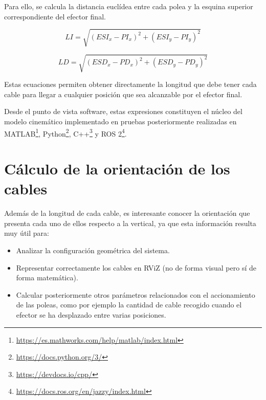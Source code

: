 \vspace{0.25cm}

Para ello, se calcula la distancia euclídea entre cada polea y la esquina superior correspondiente del efector final.

\begin{myequation}[h]
\begin{equation}
LI = \sqrt{(ESI_x - PI_x)^2 + (ESI_y - PI_y)^2} 
\end{equation}
\caption[Longitud del cable izquierdo.]{Longitud del cable izquierdo.}
\end{myequation}

\begin{myequation}[h]
\begin{equation}
LD = \sqrt{(ESD_x - PD_x)^2 + (ESD_y - PD_y)^2}
\end{equation}
\caption[Longitud del cable derecho.]{Longitud del cable derecho.}
\end{myequation}

\newpage

Estas ecuaciones permiten obtener directamente la longitud que debe tener cada cable para llegar a cualquier posición que sea alcanzable por el efector final.

\vspace{0.25cm}

Desde el punto de vista software, estas expresiones constituyen el núcleo del modelo cinemático implementado en pruebas posteriormente realizadas en MATLAB\footnote{\url{https://es.mathworks.com/help/matlab/index.html}}, Python\footnote{\url{https://docs.python.org/3/}}, C++\footnote{\url{https://devdocs.io/cpp/}} y ROS 2\footnote{\url{https://docs.ros.org/en/jazzy/index.html}}.

\section{Cálculo de la orientación de los cables}
\label{sec:segundaseccion}

Además de la longitud de cada cable, es interesante conocer la orientación que presenta cada uno de ellos respecto a la vertical, ya que esta información resulta muy útil para:

\begin{itemize}
\item Analizar la configuración geométrica del sistema.
\item Representar correctamente los cables en RViZ (no de forma visual pero sí de forma matemática).
\item Calcular posteriormente otros parámetros relacionados con el accionamiento de las poleas, como por ejemplo la cantidad de cable recogido cuando el efector se ha desplazado entre varias posiciones.
\end{itemize}

